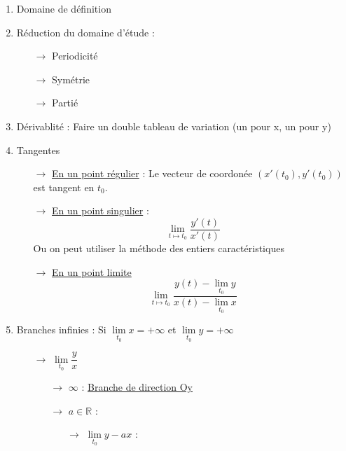 \begin{enumerate}[1-]
 \item Domaine de définition\\
 \item Réduction du domaine d'étude :\\ 
\begin{itemize} 
\item[{$\rightarrow$}] Periodicité\\
\item[{$\rightarrow$}] Symétrie\\
\item[{$\rightarrow$}] Partié\\
\end{itemize}
\item Dérivablité : Faire un double tableau de variation (un pour x, un pour y)\\
\item Tangentes\\
\begin{itemize} 
\item[{$\rightarrow$}] \underline{En un point régulier} : Le vecteur de coordonée $(x'(t_0),y'(t_0))$ est tangent en $t_0$.\\
\item[{$\rightarrow$}] \underline{En un point singulier} :\\
$$\underset{t \mapsto t_0}\lim \dfrac{y'(t)}{x'(t)}$$
Ou on peut utiliser la méthode des entiers caractéristiques
\item[{$\rightarrow$}] \underline{En un point limite}\\
$$\underset{t \mapsto t_0}\lim \dfrac{y(t)-\underset{t_0}\lim y}{x(t)-\underset{t_0}\lim x}$$
\end{itemize}
\item Branches infinies : Si $\underset{t_0}\lim x= +\infty$ et $\underset{t_0}\lim y= +\infty$\\
\begin{itemize}
 \item[$\rightarrow$] $\underset{t_0}\lim\dfrac{y}{x}$\\
\begin{itemize}
 \item[$\rightarrow$] $\infty$ : \underline{Branche de direction Oy}\\
 \item[$\rightarrow$] $a \in \mathbb{R}$ :\\
\begin{itemize}
 \item[$\rightarrow$] $\underset{t_0}\lim y-ax$ :\\

\end{itemize}
\end{itemize}
\end{itemize}
\end{enumerate}
